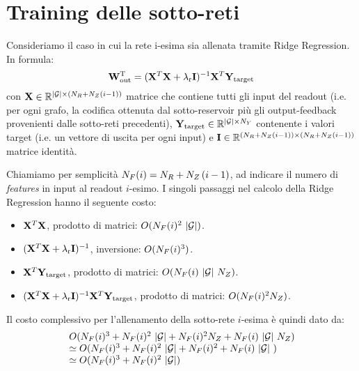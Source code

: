 \section{Training delle sotto-reti}\label{app:costo:tr_sub}
Consideriamo il caso in cui la rete i-esima sia allenata tramite Ridge Regression. In formula:
\begin{equation}\label{app:costo:ridgeregr}
\transpose{\matr{W}_\textup{out}} = (\matr{X}^T \matr{X} + \lambda_\textup{r} \matr{I})^{-1} \matr{X}^T \matr{Y}_\textup{target}
\end{equation}
con $\matr{X} \in \R^{\G \times (\Nr + \Nz (i-1))}$ matrice che contiene tutti gli input del readout (i.e. per ogni grafo, la codifica ottenuta dal sotto-reservoir più gli output-feedback provenienti dalle sotto-reti precedenti), $\matr{Y}_\textup{target} \in \R^{\G \times \Ny}$ contenente i valori target (i.e. un vettore di uscita per ogni input) e $\matr{I} \in \R^{(\Nr + \Nz (i-1)) \times (\Nr + \Nz (i-1))}$ matrice identità.

Chiamiamo per semplicità $N_F(i) = N_R + N_Z\, (i-1)$, ad indicare il numero di \emph{features} in input al readout $i$-esimo.
I singoli passaggi nel calcolo della Ridge Regression hanno il seguente costo:
\begin{itemize}
\item $\matr{X}^T \matr{X}$, prodotto di matrici: $O(N_F(i)^2\ \lvert\mathcal{G}\rvert)$.
\item $(\matr{X}^T \matr{X} + \lambda_\textup{r} \matr{I})^{-1}$, inversione: $O(N_F(i)^3)$.
\item $\matr{X}^T \matr{Y}_\textup{target}$, prodotto di matrici: $O(N_F(i)\ \lvert\mathcal{G}\rvert\ N_Z)$.
\item $(\matr{X}^T \matr{X} + \lambda_\textup{r} \matr{I})^{-1} \matr{X}^T \matr{Y}_\textup{target}$, prodotto di matrici: $O(N_F(i)^2 N_Z)$.
\end{itemize}
Il costo complessivo per l'allenamento della sotto-rete $i$-esima è quindi dato da:
\begin{equation}
\begin{array}{l}
O(N_F(i)^3 + N_F(i)^2\ \lvert\mathcal{G}\rvert + N_F(i)^2 N_Z + N_F(i)\ \lvert\mathcal{G}\rvert\ N_Z) \\
\simeq O(N_F(i)^3 + N_F(i)^2\ \lvert\mathcal{G}\rvert + N_F(i)^2 + N_F(i)\ \lvert\mathcal{G}\rvert\ ) \\
\simeq O(N_F(i)^3 + N_F(i)^2\ \lvert\mathcal{G}\rvert ) \\
\end{array}
\end{equation}

